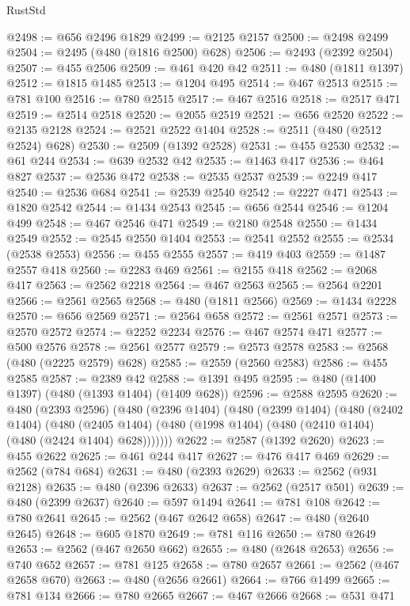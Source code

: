 \begin{lexlean}{RustStd}
\begin{coremodule}
{\begin{coremodule}
{{{{{{{{{{{{{{{{{{{{{{{{{{{{{{{{{@2498 := @656 @2496 @1829
@2499 := @2125 @2157
@2500 := @2498 @2499
@2504 := @2495 (@480 (@1816 @2500) @628)
@2506 := @2493 (@2392 @2504)
@2507 := @455 @2506
@2509 := @461 @420 @42
@2511 := @480 (@1811 @1397)
@2512 := @1815 @1485
@2513 := @1204 @495
@2514 := @467 @2513
@2515 := @781 @100
@2516 := @780 @2515
@2517 := @467 @2516
@2518 := @2517 @471
@2519 := @2514 @2518
@2520 := @2055 @2519
@2521 := @656 @2520
@2522 := @2135 @2128
@2524 := @2521 @2522 @1404
@2528 := @2511 (@480 (@2512 @2524) @628)
@2530 := @2509 (@1392 @2528)
@2531 := @455 @2530
@2532 := @61 @244
@2534 := @639 @2532 @42
@2535 := @1463 @417
@2536 := @464 @827
@2537 := @2536 @472
@2538 := @2535 @2537
@2539 := @2249 @417
@2540 := @2536 @684
@2541 := @2539 @2540
@2542 := @2227 @471
@2543 := @1820 @2542
@2544 := @1434 @2543
@2545 := @656 @2544
@2546 := @1204 @499
@2548 := @467 @2546 @471
@2549 := @2180 @2548
@2550 := @1434 @2549
@2552 := @2545 @2550 @1404
@2553 := @2541 @2552
@2555 := @2534 (@2538 @2553)
@2556 := @455 @2555
@2557 := @419 @403
@2559 := @1487 @2557 @418
@2560 := @2283 @469
@2561 := @2155 @418
@2562 := @2068 @417
@2563 := @2562 @2218
@2564 := @467 @2563
@2565 := @2564 @2201
@2566 := @2561 @2565
@2568 := @480 (@1811 @2566)
@2569 := @1434 @2228
@2570 := @656 @2569
@2571 := @2564 @658
@2572 := @2561 @2571
@2573 := @2570 @2572
@2574 := @2252 @2234
@2576 := @467 @2574 @471
@2577 := @500 @2576
@2578 := @2561 @2577
@2579 := @2573 @2578
@2583 := @2568 (@480 (@2225 @2579) @628)
@2585 := @2559 (@2560 @2583)
@2586 := @455 @2585
@2587 := @2389 @42
@2588 := @1391 @495
@2595 := @480 (@1400 @1397) (@480 (@1393 @1404) (@1409 @628))
@2596 := @2588 @2595
@2620 := @480
    (@2393 @2596)
    (@480
      (@2396 @1404)
      (@480
        (@2399 @1404)
        (@480
          (@2402 @1404)
          (@480
            (@2405 @1404)
            (@480 (@1998 @1404) (@480 (@2410 @1404) (@480 (@2424 @1404) @628)))))))
@2622 := @2587 (@1392 @2620)
@2623 := @455 @2622
@2625 := @461 @244 @417
@2627 := @476 @417 @469
@2629 := @2562 (@784 @684)
@2631 := @480 (@2393 @2629)
@2633 := @2562 (@931 @2128)
@2635 := @480 (@2396 @2633)
@2637 := @2562 (@2517 @501)
@2639 := @480 (@2399 @2637)
@2640 := @597 @1494
@2641 := @781 @108
@2642 := @780 @2641
@2645 := @2562 (@467 @2642 @658)
@2647 := @480 (@2640 @2645)
@2648 := @605 @1870
@2649 := @781 @116
@2650 := @780 @2649
@2653 := @2562 (@467 @2650 @662)
@2655 := @480 (@2648 @2653)
@2656 := @740 @652
@2657 := @781 @125
@2658 := @780 @2657
@2661 := @2562 (@467 @2658 @670)
@2663 := @480 (@2656 @2661)
@2664 := @766 @1499
@2665 := @781 @134
@2666 := @780 @2665
@2667 := @467 @2666
@2668 := @531 @471
}}}}}}}}}}}}}}}}}}}}}}}}}}}}}}}}}
\end{coremodule}}
\end{coremodule}
\end{lexlean}
